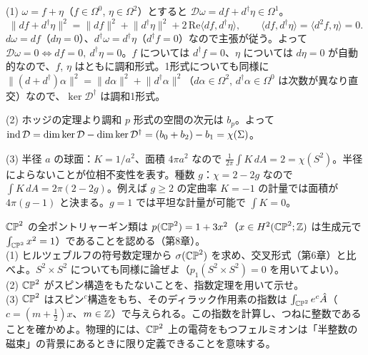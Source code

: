 \begin{solution}
(1) $\omega=f+\eta$（$f\in\Omega^0$, $\eta\in\Omega^2$）とすると $\mathcal D\omega=df+d^\dagger\eta\in\Omega^1$。
\[
\lVert df+d^\dagger\eta\rVert^2=\lVert df\rVert^2+\lVert d^\dagger\eta\rVert^2+2\,\mathrm{Re}\langle df,d^\dagger\eta\rangle,\qquad\langle df,d^\dagger\eta\rangle=\langle d^2f,\eta\rangle=0 .
\]
$d\omega=df$（$d\eta=0$）、$d^\dagger\omega=d^\dagger\eta$（$d^\dagger f=0$）なので主張が従う。よって $\mathcal D\omega=0\iff df=0,\ d^\dagger\eta=0$。$f$ については $d^\dagger f=0$、$\eta$ については $d\eta=0$ が自動的なので、$f$, $\eta$ はともに調和形式。1形式についても同様に $\lVert(d+d^\dagger)\alpha\rVert^2=\lVert d\alpha\rVert^2+\lVert d^\dagger\alpha\rVert^2$（$d\alpha\in\Omega^2$, $d^\dagger\alpha\in\Omega^0$ は次数が異なり直交）なので、$\ker\mathcal D^\dagger$ は調和1形式。

(2) ホッジの定理より調和 $p$ 形式の空間の次元は $b_p$。よって $\operatorname{ind}\mathcal D=\dim\ker\mathcal D-\dim\ker\mathcal D^\dagger=(b_0+b_2)-b_1=\chi(\Sigma)$。

(3) 半径 $a$ の球面：$K=1/a^2$、面積 $4\pi a^2$ なので $\frac1{2\pi}\int K\,dA=2=\chi(S^2)$。半径によらないことが位相不変性を表す。種数 $g$：$\chi=2-2g$ なので $\int K\,dA=2\pi(2-2g)$。例えば $g\ge2$ の定曲率 $K=-1$ の計量では面積が $4\pi(g-1)$ と決まる。$g=1$ では平坦な計量が可能で $\int K=0$。
\end{solution}

\begin{problem}[難易度 B]\label{ch09-prob-cp2}
$\mathbb{CP}^2$ の全ポントリャーギン類は $p(\mathbb{CP}^2)=1+3x^2$（$x\in H^2(\mathbb{CP}^2;\mathbb{Z})$ は生成元で $\int_{\mathbb{CP}^2}x^2=1$）であることを認める（第8章）。\\
(1) ヒルツェブルフの符号数定理から $\sigma(\mathbb{CP}^2)$ を求め、交叉形式（第6章）と比べよ。$S^2\times S^2$ についても同様に論ぜよ（$p_1(S^2\times S^2)=0$ を用いてよい）。\\
(2) $\mathbb{CP}^2$ がスピン構造をもたないことを、指数定理を用いて示せ。\\
(3) $\mathbb{CP}^2$ はスピン$^c$構造をもち、そのディラック作用素の指数は $\int_{\mathbb{CP}^2}e^{c}\hat{A}$（$c=(m+\tfrac12)x$、$m\in\mathbb{Z}$）で与えられる。この指数を計算し、つねに整数であることを確かめよ。物理的には、$\mathbb{CP}^2$ 上の電荷をもつフェルミオンは「半整数の磁束」の背景にあるときに限り定義できることを意味する。
\end{problem}

